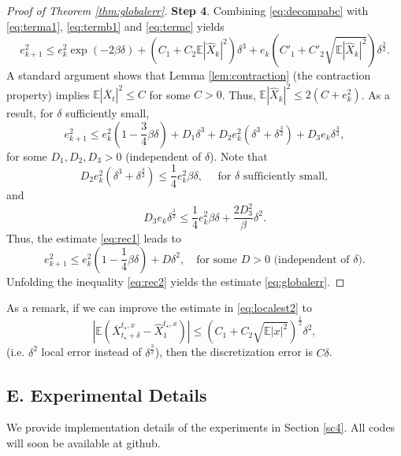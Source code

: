\documentclass[letterpaper,11pt,reqno]{amsart}
\numberwithin{equation}{section}
\begin{document}
\begin{proof}[Proof of Theorem \ref{thm:globalerr}]
{\bf Step 4}. Combining \eqref{eq:decompabc} with \eqref{eq:terma1}, \eqref{eq:termb1} and \eqref{eq:termc} yields
\begin{equation*}
e_{k+1}^2 \le e_k^2 \exp(- 2 \beta \delta) + \left( C_1 + C_2 \mathbb{E}|\widehat{X}_k|^2 \right) \delta^3 + e_k \left(C'_1 + C'_2 \sqrt{\mathbb{E}|\widehat{X}_k|^2} \right) \delta^{\frac{3}{2}}.
\end{equation*}
A standard argument shows that Lemma \ref{lem:contraction} (the contraction property) implies
$\mathbb{E}|\overline{X}_t|^2 \le C$ for some $C > 0$.
Thus, $\mathbb{E}|\widehat{X}_k|^2 \le 2(C + e_k^2)$.
As a result, for $\delta$ sufficiently small,
\begin{equation}
\label{eq:rec1}
e_{k+1}^2 \le e_k^2\left(1 - \frac{3}{4} \beta \delta \right)
+ D_1 \delta^3 + D_2 e_k^2 \left(\delta^3 + \delta^{\frac{3}{2}} \right)  + D_3 e_k \delta^{\frac{3}{2}},
\end{equation}
for some $D_1, D_2, D_3> 0$ (independent of $\delta$).
Note that 
\begin{equation*}
D_2 e_k^2 \left(\delta^3 + \delta^{\frac{3}{2}} \right) \le \frac{1}{4} e_k^2 \beta \delta, \quad \mbox{ for } \delta \mbox{ sufficiently small},
\end{equation*}
and 
\begin{equation*}
D_3 e_k \delta^{\frac{3}{2}} \le \frac{1}{4}e_k^2 \beta \delta + \frac{2 D^{2}_3}{\beta} \delta^2.
\end{equation*}
Thus, the estimate \eqref{eq:rec1} leads to
\begin{equation}
\label{eq:rec2}
e_{k+1}^2 \le e_k^2 \left(1 - \frac{1}{4} \beta \delta \right) + D \delta^2, \quad 
\mbox{for some } D > 0 \mbox{ (independent of } \delta).
\end{equation}
Unfolding the inequality \eqref{eq:rec2} yields
the estimate \eqref{eq:globalerr}.
\end{proof}

\quad As a remark, if we can improve the estimate in \eqref{eq:localest2} to
\begin{equation}
|\mathbb{E}(\overline{X}^{t_\star, x}_{t_{\star} + \delta} -\widehat{X}^{t_\star, x}_1)|
\le (C_1 + C_2 \sqrt{\mathbb{E}|x|^2} )^{\frac{1}{2}} \delta^{2},
\end{equation} 
(i.e. $\delta^2$ local error instead of $\delta^{\frac{3}{2}}$),
then the discretization error is $C \delta$.

\subsection*{E. Experimental Details}
We provide implementation details of the experiments in Section \ref{sc4}. 
All codes will soon be available at github.
\end{document}
